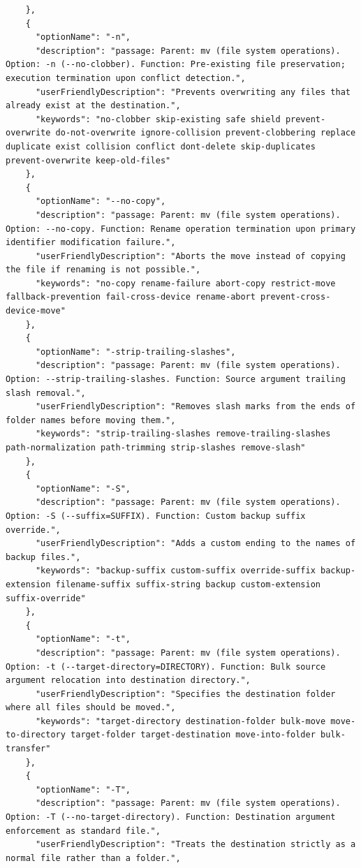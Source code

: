 \begin{appendix}
\begin{lstlisting}
    },
    {
      "optionName": "-n",
      "description": "passage: Parent: mv (file system operations). Option: -n (--no-clobber). Function: Pre-existing file preservation; execution termination upon conflict detection.",
      "userFriendlyDescription": "Prevents overwriting any files that already exist at the destination.",
      "keywords": "no-clobber skip-existing safe shield prevent-overwrite do-not-overwrite ignore-collision prevent-clobbering replace duplicate exist collision conflict dont-delete skip-duplicates prevent-overwrite keep-old-files"
    },
    {
      "optionName": "--no-copy",
      "description": "passage: Parent: mv (file system operations). Option: --no-copy. Function: Rename operation termination upon primary identifier modification failure.",
      "userFriendlyDescription": "Aborts the move instead of copying the file if renaming is not possible.",
      "keywords": "no-copy rename-failure abort-copy restrict-move fallback-prevention fail-cross-device rename-abort prevent-cross-device-move"
    },
    {
      "optionName": "-strip-trailing-slashes",
      "description": "passage: Parent: mv (file system operations). Option: --strip-trailing-slashes. Function: Source argument trailing slash removal.",
      "userFriendlyDescription": "Removes slash marks from the ends of folder names before moving them.",
      "keywords": "strip-trailing-slashes remove-trailing-slashes path-normalization path-trimming strip-slashes remove-slash"
    },
    {
      "optionName": "-S",
      "description": "passage: Parent: mv (file system operations). Option: -S (--suffix=SUFFIX). Function: Custom backup suffix override.",
      "userFriendlyDescription": "Adds a custom ending to the names of backup files.",
      "keywords": "backup-suffix custom-suffix override-suffix backup-extension filename-suffix suffix-string backup custom-extension suffix-override"
    },
    {
      "optionName": "-t",
      "description": "passage: Parent: mv (file system operations). Option: -t (--target-directory=DIRECTORY). Function: Bulk source argument relocation into destination directory.",
      "userFriendlyDescription": "Specifies the destination folder where all files should be moved.",
      "keywords": "target-directory destination-folder bulk-move move-to-directory target-folder target-destination move-into-folder bulk-transfer"
    },
    {
      "optionName": "-T",
      "description": "passage: Parent: mv (file system operations). Option: -T (--no-target-directory). Function: Destination argument enforcement as standard file.",
      "userFriendlyDescription": "Treats the destination strictly as a normal file rather than a folder.",

\end{lstlisting}
\end{appendix}
